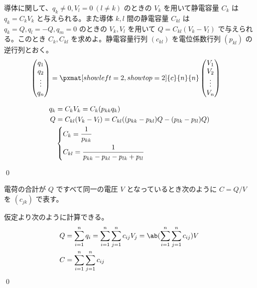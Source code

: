 \documentclass[uplatex,dvipdfmx,a4paper,11pt]{jlreq}
\makeatletter
\newcommand\mqty[1]{\begin{pmatrix}#1\end{pmatrix}}
\theoremstyle{definition}
\renewenvironment{proof}[1][\proofname]{\par
  \normalfont
  \topsep6\p@\@plus6\p@ \trivlist
  \item[\hskip\labelsep{\bfseries #1}\@addpunct{\bfseries}]\ignorespaces\quad\par
}{%
  \qed\endtrivlist\@endpefalse
}
\renewcommand\proofname{証明}
\makeatother
\begin{document}
\begin{problem}
導体に関して、$q_k \neq 0, V_l = 0\ (l\neq k)$ のときの $V_k$ を用いて静電容量 $C_k$ は $q_k = C_kV_k$ と与えられる。また導体 $k, l$ 間の静電容量 $C_{kl}$ は $q_k = Q, q_l = -Q, q_m = 0$ のときの $V_k, V_l$ を用いて $Q = C_{kl}(V_k - V_l)$ で与えられる。このとき $C_k, C_{kl}$ を求めよ。静電容量行列 $(c_{kl})$ を電位係数行列 $(p_{kl})$ の逆行列とおく。
\begin{align}
  \mqty{q_1 \\ q_2 \\ \vdots \\ q_n} & = \pxmat[showleft=2,showtop=2]{c}{n}{n}\mqty{V_1 \\ V_2 \\ \vdots \\ V_n}
\end{align}
\end{problem}
\begin{proof}
  \begin{align}
    q_k & = C_kV_k = C_k(p_{kk}q_k)                                                                                                                           \\
    Q   & = C_{kl}(V_k - V_l) = C_{kl}((p_{kk} - p_{kl})Q - (p_{lk} - p_{ll})Q)                                                                               \\
        & \begin{dcases}
            C_k = \frac{1}{p_{kk}} \\
            C_{kl} = \frac{1}{p_{kk} - p_{kl} - p_{lk} + p_{ll}}
          \end{dcases}
  \end{align}

\end{proof}

\begin{problem}
電荷の合計が $Q$ ですべて同一の電圧 $V$ となっているとき次のように $C = Q/V$ を $(c_{jk})$ で表す。
\end{problem}
\begin{proof}
  仮定より次のように計算できる。
  \begin{align}
    Q & = \sum_{i=1}^{n}q_i = \sum_{i=1}^{n}\sum_{j=1}^{n}c_{ij}V_j = \ab(\sum_{i=1}^{n}\sum_{j=1}^{n}c_{ij})V \\
    C & = \sum_{i=1}^{n}\sum_{j=1}^{n}c_{ij}
  \end{align}
\end{proof}
\end{document}
